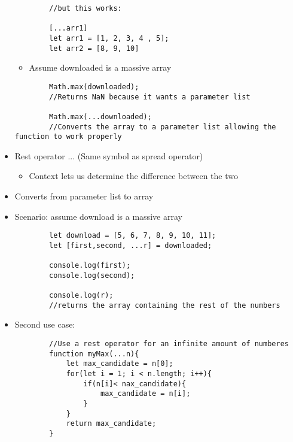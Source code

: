 \documentclass{article}
\begin{document}
\begin{itemize}
\begin{lstlisting}
        //but this works:

        [...arr1] 
        let arr1 = [1, 2, 3, 4 , 5];
        let arr2 = [8, 9, 10]
    \end{lstlisting}
    \begin{itemize}
        \item Assume downloaded is a massive array
    \end{itemize}
    \begin{lstlisting}
        Math.max(downloaded);
        //Returns NaN because it wants a parameter list

        Math.max(...downloaded);
        //Converts the array to a parameter list allowing the function to work properly
    \end{lstlisting}
    \item Rest operator ... (Same symbol as spread operator)
    \begin{itemize}
        \item Context lets us determine the difference between the two
    \end{itemize}
    \item Converts from parameter list to array
    \item Scenario: assume download is a massive array
    \begin{lstlisting}
        let download = [5, 6, 7, 8, 9, 10, 11];
        let [first,second, ...r] = downloaded;

        console.log(first);
        console.log(second);

        console.log(r);
        //returns the array containing the rest of the numbers
    \end{lstlisting}
    \item Second use case:
    \begin{lstlisting}
        //Use a rest operator for an infinite amount of numberes
        function myMax(...n){
            let max_candidate = n[0];
            for(let i = 1; i < n.length; i++){
                if(n[i]< nax_candidate){
                    max_candidate = n[i];
                }
            }
            return max_candidate;
        }


\end{lstlisting}
\end{itemize}
\end{document}

